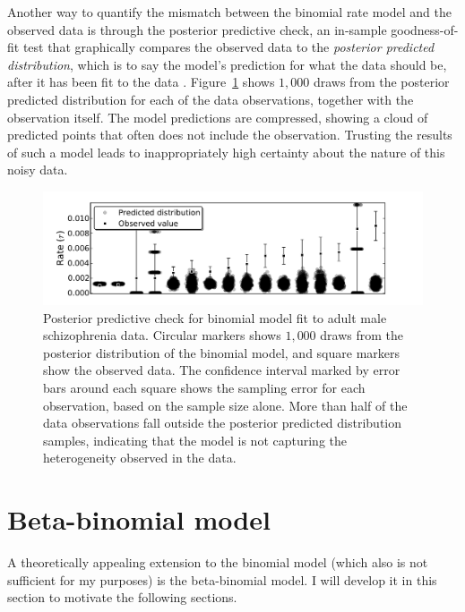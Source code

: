 Another way to quantify the mismatch between the binomial rate model and the observed data is through the posterior
predictive check, an in-sample goodness-of-fit test that graphically
compares the observed data to the \emph{posterior predicted
  distribution}, which is to say the model's prediction for what the
data should be, after it has been fit to the data \cite{gelman_bayesian_2003}.  Figure~\ref{rate-model-binom-ppc} shows $1,000$ draws from
the posterior predicted distribution for each of the data
observations, together with the observation itself.  The model
predictions are compressed, showing a cloud of predicted points that
often does not include the observation.  Trusting the results of such
a model leads to inappropriately high certainty about the nature of
this noisy data.

\begin{figure}[ht]
\begin{center}
\includegraphics[width=\textwidth]{binomial-model-ppc.pdf}
\caption{Posterior predictive check for binomial model fit to adult
  male schizophrenia data.  Circular markers shows $1,000$ draws from
  the posterior distribution of the binomial model, and square markers
  show the observed data.  The confidence interval marked by error
  bars around each square shows the sampling error for each
  observation, based on the sample size alone. More than half of the
  data observations fall outside the posterior predicted distribution
  samples, indicating that the model is not capturing the
  heterogeneity observed in the data.}
\label{rate-model-binom-ppc}
\end{center}
\end{figure}


\section{Beta-binomial model}
\label{beta-binomial-model}
A theoretically appealing extension to the binomial model (which also
is not sufficient for my purposes) is the beta-binomial model.  I will
develop it in this section to motivate the following sections.

